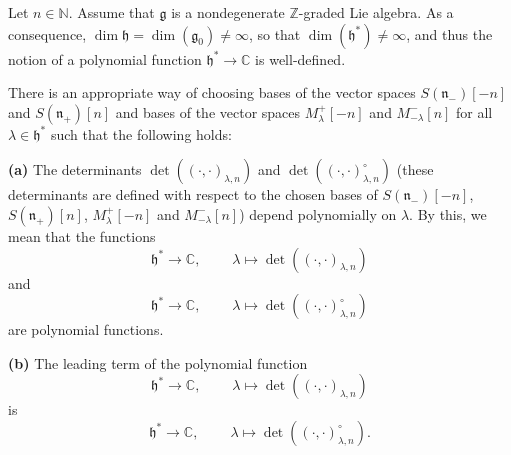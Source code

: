 \documentclass[etingof-lie.tex]{subfiles}
\begin{document}
\begin{proposition}
\label{prop.det.US}Let $n\in\mathbb{N}$. Assume that $\mathfrak{g}$ is a
nondegenerate $\mathbb{Z}$-graded Lie algebra. As a consequence,
$\dim\mathfrak{h}=\dim\left(  \mathfrak{g}_{0}\right)  \neq\infty$, so that
$\dim\left(  \mathfrak{h}^{\ast}\right)  \neq\infty$, and thus the notion of a
polynomial function $\mathfrak{h}^{\ast}\rightarrow\mathbb{C}$ is well-defined.

There is an appropriate way of choosing bases of the vector spaces $S\left(
\mathfrak{n}_{-}\right)  \left[  -n\right]  $ and $S\left(  \mathfrak{n}%
_{+}\right)  \left[  n\right]  $ and bases of the vector spaces $M_{\lambda
}^{+}\left[  -n\right]  $ and $M_{-\lambda}^{-}\left[  n\right]  $ for all
$\lambda\in\mathfrak{h}^{\ast}$ such that the following holds:

\textbf{(a)} The determinants $\det\left(  \left(  \cdot,\cdot\right)
_{\lambda,n}\right)  $ and $\det\left(  \left(  \cdot,\cdot\right)
_{\lambda,n}^{\circ}\right)  $ (these determinants are defined with respect to
the chosen bases of $S\left(  \mathfrak{n}_{-}\right)  \left[  -n\right]  $,
$S\left(  \mathfrak{n}_{+}\right)  \left[  n\right]  $, $M_{\lambda}%
^{+}\left[  -n\right]  $ and $M_{-\lambda}^{-}\left[  n\right]  $) depend
polynomially on $\lambda$. By this, we mean that the functions%
\[
\mathfrak{h}^{\ast}\rightarrow\mathbb{C},\ \ \ \ \ \ \ \ \ \ \lambda
\mapsto\det\left(  \left(  \cdot,\cdot\right)  _{\lambda,n}\right)
\]
and%
\[
\mathfrak{h}^{\ast}\rightarrow\mathbb{C},\ \ \ \ \ \ \ \ \ \ \lambda
\mapsto\det\left(  \left(  \cdot,\cdot\right)  _{\lambda,n}^{\circ}\right)
\]
are polynomial functions.

\textbf{(b)} The leading term of the polynomial function%
\[
\mathfrak{h}^{\ast}\rightarrow\mathbb{C},\ \ \ \ \ \ \ \ \ \ \lambda
\mapsto\det\left(  \left(  \cdot,\cdot\right)  _{\lambda,n}\right)
\]
is%
\[
\mathfrak{h}^{\ast}\rightarrow\mathbb{C},\ \ \ \ \ \ \ \ \ \ \lambda
\mapsto\det\left(  \left(  \cdot,\cdot\right)  _{\lambda,n}^{\circ}\right)  .
\]

\end{proposition}
\end{document}
